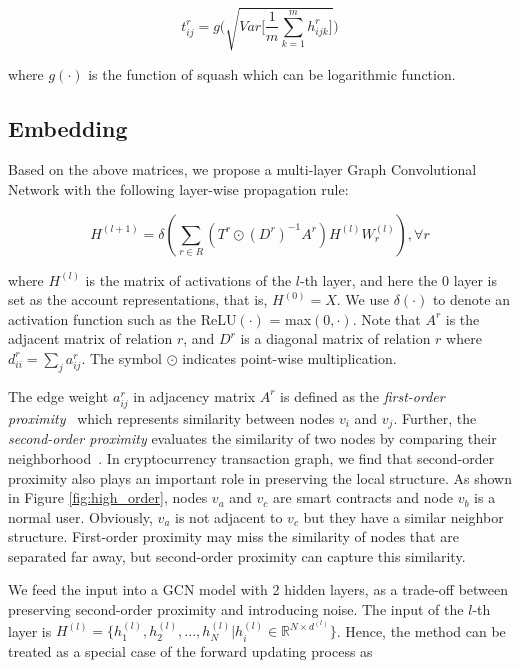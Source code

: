\begin{equation}
t_{ij}^r=g\Bigg(\sqrt{Var\Big[\frac{1}{m}\sum_{k=1}^m h_{ijk}^r\Big]}\Bigg)
\label{eq:time}
\end{equation}

\noindent where $g(\cdot)$ is the function of squash which can be logarithmic function.

\subsection{Embedding}
\label{sec:rGCN layers}
Based on the above matrices, we propose a multi-layer Graph Convolutional Network with the following layer-wise propagation rule:

\begin{equation}
H^{(l+1)}=\delta(\sum_{r\in R} (T^r\odot (D^r)^{-1}A^r)H^{(l)}W_r^{(l)}),\forall r
\end{equation}

\noindent where $H^{(l)}$ is the matrix of activations of the $l$-th layer, and here the $0$ layer is set as the account representations, that is, $H^{(0)}=X$. We use $\delta(\cdot)$ to denote an activation function such as the ReLU$(\cdot)$ = max$(0,\cdot)$. Note that $A^r$ is the adjacent matrix of relation $r$, and $D^r$ is a diagonal matrix of relation $r$ where $d^r_{ii}=\sum_{j}a^r_{ij}$. The symbol $\odot$ indicates point-wise multiplication.

The edge weight $a^r_{ij}$ in adjacency matrix $A^r$ is defined as the \emph{first-order proximity}~\cite{tang2015line} which represents similarity between nodes $v_i$ and $v_j$. Further, the \emph{second-order proximity} evaluates the similarity of two nodes by comparing their neighborhood~\cite{goyal2018graph}. In cryptocurrency transaction graph, we find that second-order proximity also plays an important role in preserving the local structure. As shown in Figure \ref{fig:high_order}, nodes $v_a$ and $v_c$ are smart contracts and node $v_b$ is a normal user. Obviously, $v_a$ is not adjacent to $v_c$  but they have a similar neighbor structure. First-order proximity may miss the similarity of nodes that are separated far away, but second-order proximity can capture this similarity.

We feed the input into a GCN model with 2 hidden layers, as a trade-off between preserving second-order proximity and introducing noise. The input of the $l$-th layer is $H^{(l)}=\{h_1^{(l)},h_2^{(l)},...,h_N^{(l)}|h_i^{(l)}\in \mathbb{R}^{N \times d^{(l)}}\}$. Hence, the method can be treated as a special case of the forward updating process as

